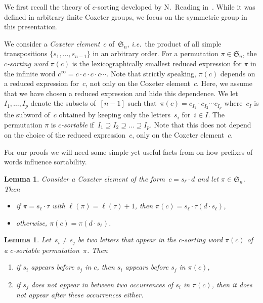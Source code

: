 \documentclass{amsart}
\newtheorem{lemma}[theorem]{Lemma}
\newcommand{\fS}{\mathfrak{S}} %
\newcommand{\defn}[1]{\textsl{\color{darkblue} #1}} %
\newcommand{\ie}{\textit{i.e.}~} %
\begin{document}
We first recall the theory of $c$-sorting developed by N.~Reading in~\cite{Reading-sortableElements}.
While it was defined in arbitrary finite Coxeter groups, we focus on the symmetric group in this presentation.

We consider a \defn{Coxeter element}~$c$ of~$\fS_n$, \ie the product of all simple transpositions $\{s_1, \dots, s_{n-1}\}$ in an arbitrary order.
For a permutation $\pi \in \fS_n$, the \defn{$c$-sorting word} $\pi(c)$ is the lexicographically smallest reduced expression for $\pi$ in the infinite word $c^\infty = c \cdot c \cdot c \cdot c \cdots$.
Note that strictly speaking, $\pi(c)$ depends on a reduced expression for~$c$, not only on the Coxeter element~$c$.
Here, we assume that we have chosen a reduced expression and hide this dependence.
We let~$I_1, \dots, I_p$ denote the subsets of~$[n-1]$ such that~$\pi(c) = c_{I_1} \cdot c_{I_2} \cdots c_{I_p}$ where~$c_I$ is the subword of~$c$ obtained by keeping only the letters~$s_i$ for~$i \in I$.
The permutation $\pi$ is \defn{$c$-sortable} if~$I_1 \supseteq I_2 \supseteq \dots \supseteq I_p$.
Note that this does not depend on the choice of the reduced expression~$c$, only on the Coxeter element~$c$.

For our proofs we will need some simple yet useful facts from \cite{Reading-sortableElements} on how prefixes of words influence sortability.

\begin{lemma}\label{lem:coxeterElementFacts}
Consider a Coxeter element of the form~$c = s_\ell \cdot d$ and let $\pi \in \fS_n$. Then
\begin{itemize}
	\item if $\pi = s_\ell \cdot \tau$ with $\ell(\pi) = \ell(\tau) + 1$, then $\pi(c) = s_\ell \cdot \tau(d \cdot s_\ell)$,
	\item otherwise, $\pi(c) = \pi(d \cdot s_\ell)$.
\end{itemize}
\end{lemma}

\begin{lemma}\label{lem:vincent8}
Let~$s_i \ne s_j$ be two letters that appear in the $c$-sorting word $\pi(c)$ of a $c$-sortable permutation~$\pi$. Then
\begin{enumerate} 
	\item if $s_i$ appears before $s_j$ in $c$, then $s_i$ appears before $s_j$ in $\pi(c)$,
	\item if $s_j$ does not appear in between two occurrences of $s_i$ in $\pi(c)$, then it does not appear after these occurrences either.
\end{enumerate}
\end{lemma}
\end{document}
